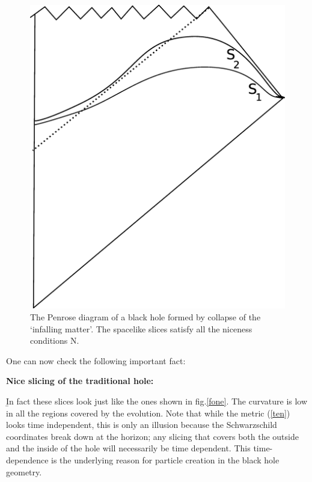 \documentclass[12pt]{article}
\begin{document}
\begin{figure}[htbp]
\begin{center}
\includegraphics[scale=.25]{fthree.eps}
\caption{{The Penrose diagram of a black hole formed by collapse of the `infalling matter'. The spacelike slices satisfy all the niceness conditions N.}}
\label{fthree}
\end{center}
\end{figure}



One can now check the following important fact: 

\b

{\bf Nice slicing of the traditional hole: } 

\b

In fact these slices look just like the ones shown in fig.\ref{fone}.   The curvature is low in all the regions covered by the evolution. Note that while the metric (\ref{ten}) looks time independent, this is only an illusion because the Schwarzschild coordinates break down at the horizon; any slicing that covers both the outside and the inside of the hole will necessarily be time dependent.
This time-dependence is the underlying reason for particle creation in the black hole geometry.
\end{document}
